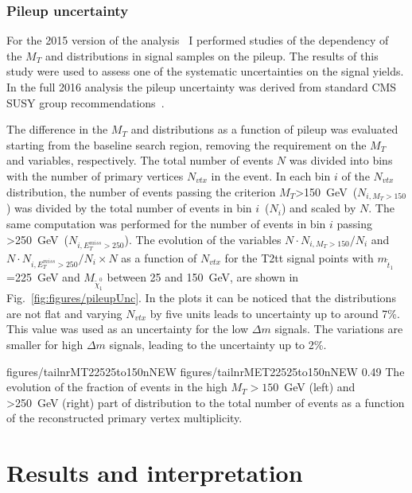 \subsubsection{Pileup uncertainty}

For the 2015 version of the analysis~\cite{Sirunyan:2016jpr} I performed studies of the dependency of the $M_{T}$ and \MET distributions in signal samples on the pileup. The results of this study were used to assess one of the systematic uncertainties on the signal yields. In the full 2016 analysis the pileup uncertainty was derived from standard CMS SUSY group recommendations~\cite{website:SUSYrec}.

The difference in the $M_{T}$ and \MET distributions as a function of pileup was evaluated starting from the baseline search region, removing the requirement on the $M_{T}$ and \MET variables, respectively. The total number of events $N$ was divided into bins with the number of primary vertices  $N_{vtx}$ in the event. In each  bin $i$ of the $N_{vtx}$ distribution, the number of events passing the criterion $M_{T}$>150~GeV~($N_{i,M_{T}>150}$) was divided by the total number of events in bin $i$~($N_{i}$) and scaled by $N$. The same computation was performed for the number of events in bin $i$ passing \MET>250~GeV~($N_{i,E_{T}^{miss}>250}$). The evolution of the variables $N \cdot N_{i,M_{T}>150}/N_{i}$ and $N \cdot N_{i,E_{T}^{miss}>250}/N_{i} \times N$ as a function of $N_{vtx}$ for the T2tt signal points with $m_{\tilde{t}_{1}}$=225~GeV and $M_{\tilde{\chi}_{1}^{0}}$ between 25 and 150~GeV, are shown in Fig.~\ref{fig:figures/pileupUnc}. In the plots it can be noticed that  the distributions are not flat and varying $N_{vtx}$ by five units leads to uncertainty up to around 7\%. This value was used as an uncertainty for the low $\Delta m$ signals. The variations are smaller for high $\Delta m$ signals, leading to the uncertainty up to 2\%.

                 {figures/tailnrMT22525to150nNEW} %
                 {figures/tailnrMET22525to150nNEW} %
                 {0.49}       %
                 { The evolution  of the fraction of events in the high $M_{T}>150$~GeV (left) and \MET>250~GeV (right) part of distribution to the total number of events as a function of the reconstructed primary vertex multiplicity. }

\newpage

\section{Results and interpretation~\label{sec:results}}


